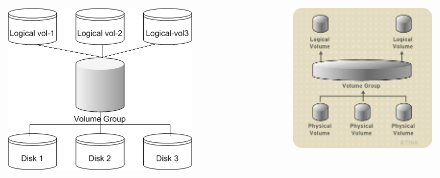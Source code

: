 \documentclass[croatian,t]{beamer} %
\begin{document}
	\begin{frame}
    	\begin{columns}
    		\begin{column}{4cm}
    			\begin{figure}
					\includegraphics[width=1.2\textwidth]{../pics/lvm.png}
				\end{figure}
			\end{column}
			\begin{column}{4cm}
				\begin{figure}
					\includegraphics[width=1.2\textwidth]{../pics/basic-lvm-volume.png}
				\end{figure}
			\end{column}
		\end{columns}
    \end{frame}
\end{document}
